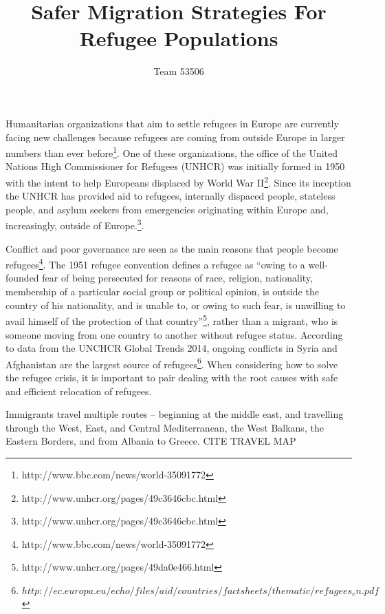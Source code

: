 \documentclass{article}
\title{Safer Migration Strategies For Refugee Populations}
\author{Team 53506}
\begin{document}
\maketitle
\tableofcontents

\maketitle

\newpage


Humanitarian organizations that aim to settle refugees in Europe are currently facing new challenges because refugees are coming from outside Europe in larger numbers than ever before\footnote{http://www.bbc.com/news/world-35091772}. One of these organizations, the office of the United Nations High Commissioner for Refugees (UNHCR) was initially formed in 1950 with the intent to help Europeans displaced by World War II\footnote{http://www.unhcr.org/pages/49c3646cbc.html}. Since its inception the UNHCR has provided aid to refugees, internally dispaced people, stateless people, and asylum seekers from emergencies originating within Europe and, increasingly, outside of Europe.\footnote{http://www.unhcr.org/pages/49c3646cbc.html}.

Conflict and poor governance are seen as the main reasons that people become refugees\footnote{http://www.bbc.com/news/world-35091772}. The 1951 refugee convention defines a refugee as ``owing to a well-founded fear of being persecuted for reasons of race, religion, nationality, membership of a particular social group or political opinion, is outside the country of his nationality, and is unable to, or owing to such fear, is unwilling to avail himself of the protection of that country''\footnote{http://www.unhcr.org/pages/49da0e466.html}, rather than a migrant, who is someone moving from one country to another without refugee status. According to data from the UNCHCR Global Trends 2014, ongoing conflicts in Syria and Afghanistan are the largest source of refugees\footnote{$http://ec.europa.eu/echo/files/aid/countries/factsheets/thematic/refugees_en.pdf$}. When considering how to solve the refugee crisis, it is important to pair dealing with the root causes with safe and efficient relocation of refugees.

Immigrants travel multiple routes -- beginning at the middle east, and travelling through the West, East, and Central Mediterranean, the West Balkans, the Eastern Borders, and from Albania to Greece.
CITE TRAVEL MAP
\end{document}
